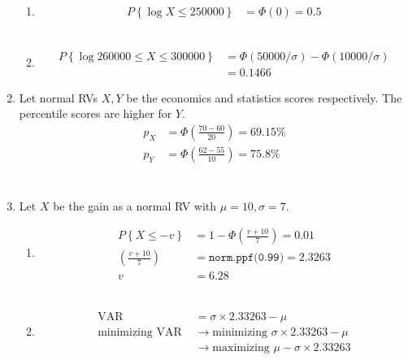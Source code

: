 \begin{enumerate}
		\begin{enumerate}
			\item \begin{align}
				P \left\{\log X \leq 250000\right\} &= \Phi(0) = 0.5
			\end{align}\\
			
			\item \begin{align}
				P \left\{\log 260000 \leq X \leq 300000\right\} &= \Phi(50000 / \sigma) - \Phi(10000/ \sigma) \nonumber \\
				&= 0.1466 
			\end{align}
		\end{enumerate}
	
	
	\item Let normal RVs $ X, Y $ be the economics and statistics scores respectively. The percentile scores are higher for $ Y $.\\
			
		\begin{align}
			p_X &= \Phi \left(\frac{70-60}{20}\right) = 69.15\% \nonumber \\
			p_Y &= \Phi \left(\frac{62-55}{10}\right) = 75.8\% \nonumber \\
		\end{align}\\
	
	
	\item Let $ X $ be the gain as a normal RV with $ \mu = 10, \sigma = 7 $.\\
			
		\begin{enumerate}
			\item \begin{align}
				P \left\{X \leq -v\right\} &= 1 - \Phi \left(\frac{v + 10}{7}\right) = 0.01 \nonumber \\
				\left(\frac{v + 10}{7}\right) &= \texttt{norm.ppf(0.99)} = 2.3263 \nonumber \\
				v &= 6.28
			\end{align}\\
			
			\item \begin{align}
				\mathrm{VAR} &= \sigma \times 2.33263 - \mu \nonumber \\
				\text{minimizing VAR } &\to \text{minimizing } \sigma \times 2.33263 - \mu \nonumber \\
				&\to \text{maximizing }  \mu - \sigma \times 2.33263
			\end{align}
		\end{enumerate}
	

\end{enumerate}
